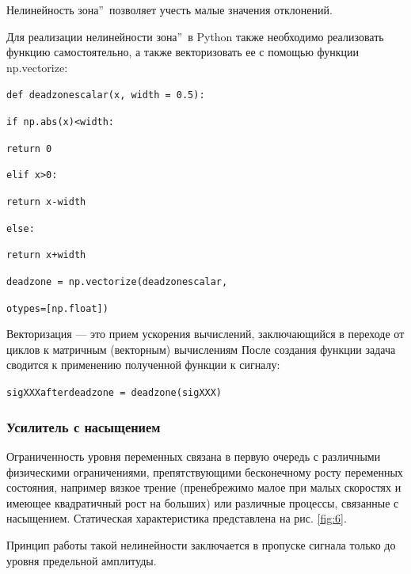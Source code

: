Нелинейность  зона\textquotedblright\ позволяет учесть малые значения отклонений.

Для реализации нелинейности  зона\textquotedblright\ в Python также необходимо реализовать функцию самостоятельно,
а также векторизовать ее с помощью функции np.vectorize:

\texttt{def dead\textunderscore zone\textunderscore scalar(x, width = 0.5):}

\texttt{\hspace{10mm}if np.abs(x)<width:}

\texttt{\hspace{20mm}return 0}

\texttt{\hspace{10mm}elif x>0:}

\texttt{\hspace{20mm}return x-width}

\texttt{\hspace{10mm}else:}

\texttt{\hspace{20mm}return x+width}

\texttt{dead\textunderscore zone = np.vectorize(dead\textunderscore zone\textunderscore scalar,}

\texttt{otypes=[np.float])}

Векторизация — это прием ускорения вычислений, заключающийся в переходе от циклов к матричным (векторным) вычислениям
После создания функции задача сводится к применению полученной функции к сигналу:

\texttt{sig\textunderscore XXX\textunderscore after\textunderscore dead\textunderscore zone = dead\textunderscore zone(sig\textunderscore XXX)}
\subsubsection{Усилитель с насыщением}
Ограниченность уровня переменных связана в первую очередь с различными физическими ограничениями, 
препятствующими бесконечному росту переменных состояния, например вязкое трение (пренебрежимо малое
при малых скоростях и имеющее квадратичный рост на больших) или различные процессы, связанные с насыщением. 
Статическая характеристика представлена на рис. \ref{fig:6}.

Принцип работы такой нелинейности заключается в пропуске сигнала только до уровня предельной амплитуды.

